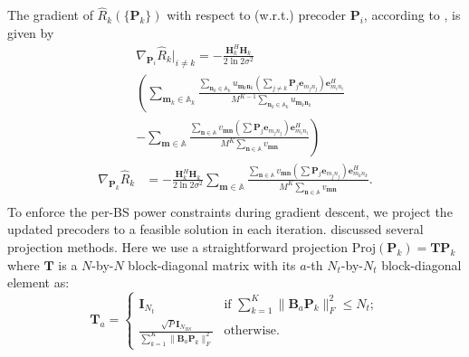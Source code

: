 \documentclass{article}
\begin{document}
    The gradient of $\hat{R}_k(\{\mathbf{P}_k\})$ with respect to (w.r.t.)  precoder $\mathbf{P}_i$, according to \cite{hjorungnes2011complex}, is given by
    \begin{equation}
        \label{eq:gradARSGDP1}
        \begin{aligned}
            & \nabla_{\mathbf{P}_i}\hat{R}_k|_{i\not=k} = -\frac{\mathbf{H}_k^H\mathbf{H}_k}{2\ln2\sigma^2}\\
            & \left(\sum_{\mathbf{m}_k\in \mathbb{A}_k}\frac{\sum_{\mathbf{n}_k\in \mathbb{A}_k}u_{\mathbf{m}_k\mathbf{n}_k}\left(\sum_{j\not=k}\mathbf{P}_j\mathbf{e}_{m_jn_j}\right)\mathbf{e}_{m_in_i}^H}{M^{K-1}\sum_{\mathbf{n}_k\in \mathbb{A}_k}u_{\mathbf{m}_k\mathbf{n}_k}}\right. \\
            & \left. - \sum_{\mathbf{m}\in \mathbb{A}} \frac{\sum_{\mathbf{n}\in \mathbb{A}}v_{\mathbf{m}\mathbf{n}}\left(\sum\mathbf{P}_j\mathbf{e}_{m_jn_j}\right)\mathbf{e}_{m_in_i}^H}{M^K\sum_{\mathbf{n}\in \mathbb{A}}v_{\mathbf{m}\mathbf{n}}}\right)
        \end{aligned}
    \end{equation}
    \begin{equation}
        \label{eq:gradARSGDP2}
        \begin{aligned}
            \nabla_{\mathbf{P}_k}\hat{R}_k & = -\frac{\mathbf{H}_k^H\mathbf{H}_k}{2\ln2\sigma^2}\sum_{\mathbf{m}\in \mathbb{A}}\frac{\sum_{\mathbf{n}\in \mathbb{A}}v_{\mathbf{m}\mathbf{n}}\left(\sum\mathbf{P}_j\mathbf{e}_{m_jn_j}\right)\mathbf{e}_{m_kn_k}^H}{M^K\sum_{\mathbf{n}\in \mathbb{A}}v_{\mathbf{m}\mathbf{n}}}. \\
        \end{aligned}
    \end{equation}
    To enforce the per-BS power constraints during gradient descent, we project the updated precoders to a feasible solution
    in each iteration. \cite{zhang2004cochannel} discussed several projection methods.
    Here we use a straightforward projection $\mbox{Proj}(\mathbf{P}_k)=\mathbf{TP}_k$ where $\mathbf{T}$ is a $N$-by-$N$ block-diagonal matrix
    with its $a$-th $N_t$-by-$N_t$ block-diagonal element as:
    \begin{equation}
        \label{eq:Proj}
           \mathbf{T}_a = \left\{
                             \begin{array}{ll}
                                   \mathbf{I}_{N_{t}} & \mbox{if } \sum_{k=1}^K\|\mathbf{B}_a\mathbf{P}_k\|_F^2 \leq N_t; \\
                                   \frac{\sqrt{P}\mathbf{I}_{N_{BS}}}{\sum_{k=1}^K\|\mathbf{B}_a\mathbf{P}_k\|_F^2} & \mbox{otherwise.}
                             \end{array}
                          \right.
    \end{equation}
\end{document}
